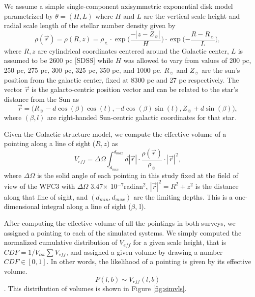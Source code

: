 \documentclass[manuscript]{aastex63}
\begin{document}
We assume a simple single-component axisymmetric exponential disk model parametrized by $\theta=(H, L)$ where $H$ and $L$ are the vertical scale height and radial scale length of the stellar number density given by
\begin{equation} 
\rho(\vec{r}) =\rho(R, z)= \rho _\sun \cdot \exp \biggl( {\frac{-|z-Z_\sun|}{H}} \biggl) \cdot \exp \biggl( {-\frac{R-R_\sun}{L}} \biggl),
\end{equation} 
where $R,z$ are cylindrical coordinates centered around the Galactic center, $L$ is assumed to be 2600 pc [SDSS] while $H$ was allowed to vary from values of 200 pc, 250 pc, 275 pc, 300 pc, 325 pc, 350 pc, and 1000 pc. $R_\sun$ and $Z_\sun$ are the sun's position from the galactic center, fixed at 8300 pc and 27 pc respectively. The vector $\vec{r}$ is the galacto-centric position vector and can be related to the star's distance from the Sun as 
\begin{equation} 
\vec{r} =  \biggl( R_\sun - d\cos(\beta) \cos(l), -d \cos(\beta) \sin(l), Z_\sun + d \sin (\beta)  \biggl), 
\end{equation} 
where $(\beta, l)$ are right-handed Sun-centric galactic coordinates for that star.

Given the Galactic structure model, we compute the effective volume of a pointing along a line of sight ($R, z$) as 
\begin{equation}
V_{eff}=\Delta \Omega \int _{d_{min}} ^{d_{max}} d|\vec{r}|  \cdot \frac{\rho(\vec{r})} {\rho _\sun}\cdot |\vec{r}|^2, 
\end{equation} 
where $\Delta \Omega$ is the solid angle of each pointing in this study fixed at the field of view of the WFC3 with $\Delta \Omega$ 3.47$\times$ 10$^{-7}$radian$^2$, $|\vec{r}|^2 = R^2 +z ^2$ is the distance along that line of sight, and $(d_{min}, d_{max})$ are the limiting depths. This is a one-dimensional integral along a line of sight ($\beta$, l).

After computing the effective volume of all the pointings in both surveys, we assigned a pointing to each of the simulated systems. We simply computed the normalized cumulative distribution of $V_{eff}$ for a given scale height, that is $CDF = 1/V_{tot}\sum V_{eff}  $, and assigned a given volume by drawing a number $CDF \in  [0, 1]$.  In other words, the likelihood of a pointing is given by its effective volume. \begin{equation} P(l, b) \sim  V_{eff}(l, b) \end{equation}. This distribution of volumes is shown in Figure \ref{fig:simvls}. 
\end{document}
